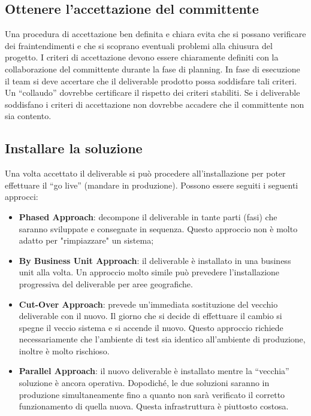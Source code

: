 \subsection{Ottenere l’accettazione del committente}
Una procedura di accettazione ben definita e chiara evita che si possano verificare dei fraintendimenti e che si scoprano eventuali problemi alla chiusura del progetto. I criteri di accettazione devono essere chiaramente definiti con la collaborazione del committente durante la fase di planning. In fase di esecuzione il team si deve accertare che il deliverable prodotto possa soddisfare tali criteri. Un “collaudo” dovrebbe certificare il rispetto dei criteri stabiliti. Se i deliverable soddisfano i criteri di accettazione non dovrebbe accadere che il committente non sia contento.

\subsection{Installare la soluzione}
Una volta accettato il deliverable si può procedere all’installazione per poter effettuare il “go live” (mandare in produzione). Possono essere seguiti i seguenti approcci:
\begin{itemize}
	\item \textbf{Phased Approach}: decompone il deliverable in tante parti (fasi) che saranno sviluppate e consegnate in sequenza. Questo approccio non è molto adatto per "rimpiazzare" un sistema;
	\item \textbf{By Business Unit Approach}: il deliverable è installato in una business unit alla volta. Un approccio molto simile può prevedere l’installazione progressiva del deliverable per aree geografiche.
	\item \textbf{Cut-Over Approach}: prevede un’immediata sostituzione del vecchio deliverable con il nuovo. Il giorno che si decide di effettuare il cambio si spegne il veccio sistema e si accende il nuovo. Questo approccio richiede necessariamente che l’ambiente di test sia identico all’ambiente di produzione, inoltre è molto rischioso.
	\item \textbf{Parallel Approach}: il nuovo deliverable è installato mentre la “vecchia” soluzione è ancora operativa. Dopodiché, le due soluzioni saranno in produzione simultaneamente fino a quanto non sarà verificato il corretto funzionamento di quella nuova. Questa infrastruttura è piuttosto costosa.
\end{itemize}
